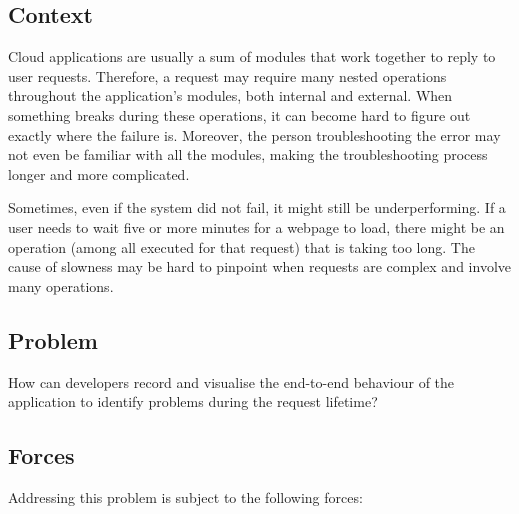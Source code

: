 \documentclass[runningheads]{llncs}
\begin{document}
\subsection{Context}
Cloud applications are usually a sum of modules that work together to reply to user requests. Therefore, a request may require many nested operations throughout the application's modules, both internal and external. When something breaks during these operations, it can become hard to figure out exactly where the failure is. Moreover, the person troubleshooting the error may not even be familiar with all the modules, making the troubleshooting process longer and more complicated.

Sometimes, even if the system did not fail, it might still be underperforming. If a user needs to wait five or more minutes for a webpage to load, there might be an operation (among all executed for that request) that is taking too long. The cause of slowness may be hard to pinpoint when requests are complex and involve many operations.

\subsection{Problem}
How can developers record and visualise the end-to-end behaviour of the application to identify problems during the request lifetime?

\subsection{Forces}
Addressing this problem is subject to the following forces:
\end{document}
